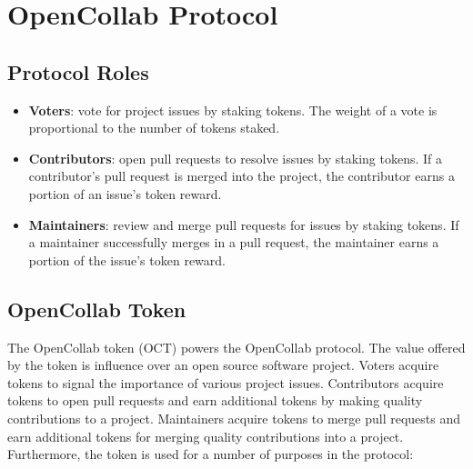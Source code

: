\section{OpenCollab Protocol}
\label{sec:opencollab}

\subsection{Protocol Roles}

\begin{itemize}
  \item \textbf{Voters}: vote for project issues by staking tokens. The weight
    of a vote is proportional to the number of tokens staked.
  \item \textbf{Contributors}: open pull requests to resolve issues by staking
    tokens. If a contributor's pull request is merged into the project, the
    contributor earns a portion of an issue's token reward.
  \item \textbf{Maintainers}: review and merge pull requests for issues by
    staking tokens. If a maintainer successfully merges in a pull request, the
    maintainer earns a portion of the issue's token reward.
\end{itemize}

\subsection{OpenCollab Token}

The OpenCollab token (OCT) powers the OpenCollab protocol. The value offered by
the token is influence over an open source software project. Voters acquire tokens
to signal the importance of various project issues. Contributors acquire tokens to
open pull requests and earn additional tokens by making quality contributions to
a project. Maintainers acquire tokens to merge pull requests and earn additional
tokens for merging quality contributions into a project. Furthermore, the token is
used for a number of purposes in the protocol:


